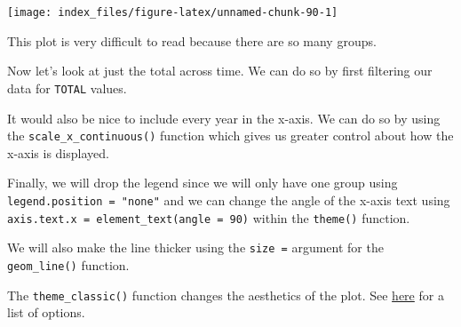 \documentclass[
]{article}
\begin{document}
\begin{center}\texttt{[image: index\_files/figure-latex/unnamed-chunk-90-1]} \end{center}

This plot is very difficult to read because there are so many groups.

Now let's look at just the total across time. We can do so by first
filtering our data for \texttt{TOTAL} values.

It would also be nice to include every year in the x-axis. We can do so
by using the \texttt{scale\_x\_continuous()} function which gives us
greater control about how the x-axis is displayed.

Finally, we will drop the legend since we will only have one group using
\texttt{legend.position\ =\ "none"} and we can change the angle of the
x-axis text using \texttt{axis.text.x\ =\ element\_text(angle\ =\ 90)}
within the \texttt{theme()} function.

We will also make the line thicker using the \texttt{size\ =} argument
for the \texttt{geom\_line()} function.

The \texttt{theme\_classic()} function changes the aesthetics of the
plot. See
\href{https://ggplot2.tidyverse.org/reference/ggtheme.html}{here} for a
list of options.
\end{document}
